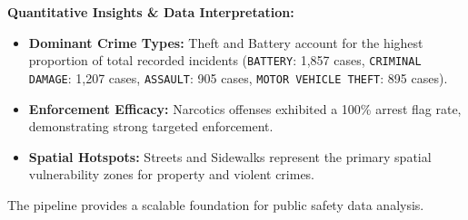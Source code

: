 \documentclass[12pt, a4paper]{article}
\begin{document}
\textbf{Quantitative Insights \& Data Interpretation:}
\begin{itemize}
    \item \textbf{Dominant Crime Types:} Theft and Battery account for the highest proportion of total recorded incidents (\texttt{BATTERY}: 1,857 cases, \texttt{CRIMINAL DAMAGE}: 1,207 cases, \texttt{ASSAULT}: 905 cases, \texttt{MOTOR VEHICLE THEFT}: 895 cases).
    \item \textbf{Enforcement Efficacy:} Narcotics offenses exhibited a 100\% arrest flag rate, demonstrating strong targeted enforcement.
    \item \textbf{Spatial Hotspots:} Streets and Sidewalks represent the primary spatial vulnerability zones for property and violent crimes.
\end{itemize}
The pipeline provides a scalable foundation for public safety data analysis.
\end{document}
